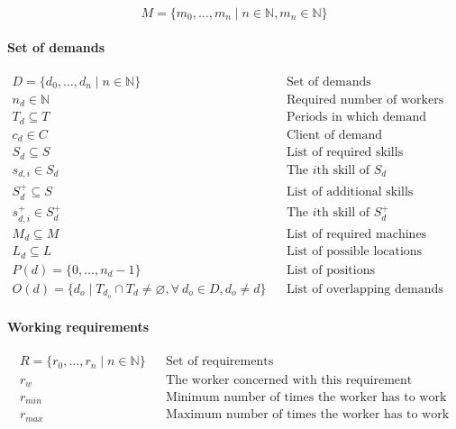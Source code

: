 \documentclass[../../thesis.tex]{subfiles}
\begin{document}
\begin{equation*}
  M = \{ m_0, \dots, m_n \mid n \in \mathbb{N}, m_n \in \mathbb{N} \}
\end{equation*}


\paragraph{Set of demands}

\begin{align*}
  D = \{ d_0, \dots, d_n \mid n \in \mathbb{N} \} && \text{Set of demands} \\
  n_d \in \mathbb{N} && \text{Required number of workers} \\ 
  T_d \subseteq T && \text{Periods in which demand occurs} \\ 
  c_d \in C && \text{Client of demand} \\ 
  S_d \subseteq S && \text{List of required skills} \\
  s_{d,i} \in S_d && \text{The $i$th skill of $S_d$} \\ 
  S^{+}_d \subseteq S && \text{List of additional skills} \\ 
  s^{+}_{d,i} \in S^{+}_d && \text{The $i$th skill of $S^{+}_d$} \\ 
  M_d \subseteq M && \text{List of required machines} \\ 
  L_d \subseteq L && \text{List of possible locations} \\
  P(d) = \{ 0, \dots, n_d - 1 \} && \text{List of positions} \\
  O(d) = \{ d_o \mid T_{d_o} \cap T_d \neq \varnothing, \forall \ d_o \in D, d_o \neq d \} && \text{List of overlapping demands}
\end{align*}

\paragraph{Working requirements}

\begin{align*}
    R = \{ r_0, \dots, r_n \mid n \in \mathbb{N} \} && \text{Set of requirements} \\ 
    r_{w}   && \text{The worker concerned with this requirement} \\
    r_{min} && \text{Minimum number of times the worker has to work} \\
    r_{max} && \text{Maximum number of times the worker has to work}
\end{align*}
\end{document}
